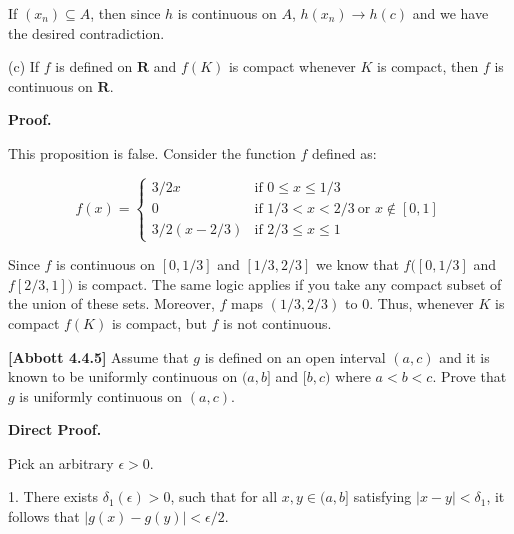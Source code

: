 \documentclass[10pt]{article}
\begin{document}
If $\displaystyle ( x_{n}) \subseteq A$, then since $\displaystyle h$ is continuous on $\displaystyle A$, $\displaystyle h( x_{n})\rightarrow h( c)$ and we have the desired contradiction.



(c) \textbf{ }If $\displaystyle f$ is defined on $\displaystyle \mathbf{R}$ and $\displaystyle f( K)$ is compact whenever $\displaystyle K$ is compact, then $\displaystyle f$ is continuous on $\displaystyle \mathbf{R}$.



\textbf{Proof. }



This proposition is false. Consider the function $\displaystyle f$ defined as:


\begin{equation*}
f( x) =\begin{cases}
3/2x & \text{if } 0\leq x\leq 1/3\\
0 & \text{if } 1/3< x< 2/3\ \text{or } x\notin [ 0,1]\\
3/2( x-2/3) & \text{if } 2/3\leq x\leq 1
\end{cases}
\end{equation*}


Since $\displaystyle f$ is continuous on $\displaystyle [ 0,1/3]$ and $\displaystyle [ 1/3,2/3]$ we know that $\displaystyle f([ 0,1/3]$ and $\displaystyle f[ 2/3,1])$ is compact. The same logic applies if you take any compact subset of the union of these sets. Moreover, $\displaystyle f$ maps $\displaystyle ( 1/3,2/3)$ to $\displaystyle 0$. Thus, whenever $\displaystyle K$ is compact $\displaystyle f( K)$ is compact, but $\displaystyle f$ is not continuous.



\textbf{ [Abbott 4.4.5]} Assume that $\displaystyle g$ is defined on an open interval $\displaystyle ( a,c)$ and it is known to be uniformly continuous on $\displaystyle ( a,b]$ and $\displaystyle [ b,c)$ where $\displaystyle a< b< c$. Prove that $\displaystyle g$ is uniformly continuous on $\displaystyle ( a,c)$.



\textbf{Direct Proof.}



Pick an arbitrary $\displaystyle \epsilon  >0$.



1. There exists $\displaystyle \delta _{1}( \epsilon )  >0$, such that for all $\displaystyle x,y\in ( a,b]$ satisfying $\displaystyle |x-y|< \delta _{1}$, it follows that $\displaystyle |g( x) -g( y) |< \epsilon /2$.
\end{document}

